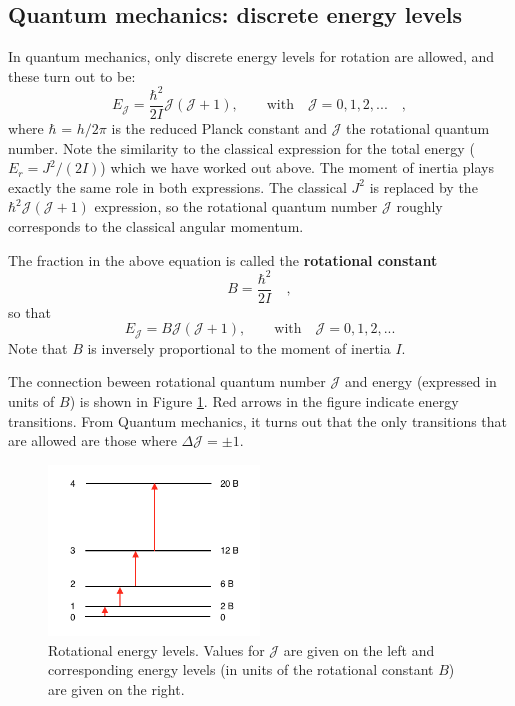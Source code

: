 \subsection{Quantum mechanics: discrete energy levels}

In quantum mechanics, only discrete energy levels for rotation are
allowed, and these turn out to be:
\begin{equation}
E_\mathcal{J} = \frac{\hbar^2}{2I} \mathcal{J}(\mathcal{J}+1), \qquad
\text{with} \quad \mathcal{J} = 0, 1, 2, ... \quad ,
\end{equation}
where $\hbar$ = $h/2\pi$ is the reduced Planck constant and $\mathcal{J}$ the
rotational quantum number. Note the similarity to the classical
expression for the total energy ($E_r={J^2}/{(2I)}$) which we have
worked out above. The moment of inertia plays exactly the same role in
both expressions. The classical $J^2$ is replaced by the $\hbar^2
\mathcal{J}(\mathcal{J}+1)$ expression, so the rotational quantum
number $\mathcal{J}$ roughly corresponds to the classical angular momentum.

The fraction in the above equation is
called the \textbf{rotational constant} 
\begin{equation}
  B = \frac{\hbar^2}{2I} \quad  ,
\end{equation}
so that
\begin{equation}
E_\mathcal{J} = B \mathcal{J}(\mathcal{J}+1), \qquad \text{with} \quad \mathcal{J} = 0, 1, 2, ...
\end{equation}
Note that $B$ is inversely proportional to the moment of inertia $I$.

The connection beween rotational quantum number $\mathcal{J}$ and
energy (expressed in units of $B$) is shown in Figure
\ref{fig:energy_levels}. Red arrows in the figure indicate energy
transitions.  From Quantum mechanics, it turns out that the only
transitions that are allowed are those where
$\Delta \mathcal{J} = \pm1$. 

\begin{figure}
\begin{center}
\includegraphics[width=0.5\textwidth]{figures/Energy_levels}
\caption{Rotational energy levels. Values for $\mathcal{J}$ are given on the left and corresponding energy
  levels (in units of the rotational constant $B$) are given on the right.}
\label{fig:energy_levels}
\end{center}
\end{figure}

